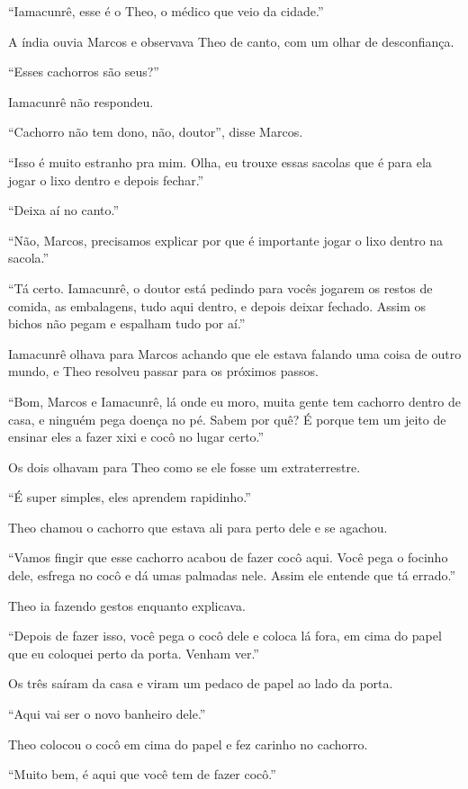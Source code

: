 ``Iamacunrê, esse é o Theo, o médico que veio da cidade.''

A índia ouvia Marcos e observava Theo de canto, com um olhar de
desconfiança.

``Esses cachorros são seus?''

Iamacunrê não respondeu.

``Cachorro não tem dono, não, doutor'', disse Marcos.

``Isso é muito estranho pra mim. Olha, eu trouxe essas sacolas que é
para ela jogar o lixo dentro e depois fechar.''

``Deixa aí no canto.''

``Não, Marcos, precisamos explicar por que é importante jogar o lixo
dentro na sacola.''

``Tá certo. Iamacunrê, o doutor está pedindo para vocês jogarem os
restos de comida, as embalagens, tudo aqui dentro, e depois deixar
fechado. Assim os bichos não pegam e espalham tudo por aí.''

Iamacunrê olhava para Marcos achando que ele estava falando uma coisa de
outro mundo, e Theo resolveu passar para os próximos passos.

``Bom, Marcos e Iamacunrê, lá onde eu moro, muita gente tem cachorro
dentro de casa, e ninguém pega doença no pé. Sabem por quê? É porque tem
um jeito de ensinar eles a fazer xixi e cocô no lugar certo.''

Os dois olhavam para Theo como se ele fosse um extraterrestre.

``É super simples, eles aprendem rapidinho.''

Theo chamou o cachorro que estava ali para perto dele e se agachou.

``Vamos fingir que esse cachorro acabou de fazer cocô aqui. Você pega o
focinho dele, esfrega no cocô e dá umas palmadas nele. Assim ele entende
que tá errado.''

Theo ia fazendo gestos enquanto explicava.

``Depois de fazer isso, você pega o cocô dele e coloca lá fora, em cima
do papel que eu coloquei perto da porta. Venham ver.''

Os três saíram da casa e viram um pedaco de papel ao lado da porta.

``Aqui vai ser o novo banheiro dele.''

Theo colocou o cocô em cima do papel e fez carinho no cachorro.

``Muito bem, é aqui que você tem de fazer cocô.''


